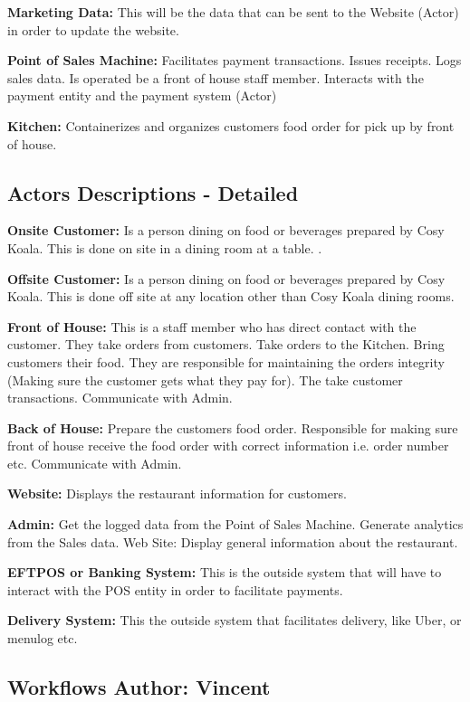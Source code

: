 \documentclass{article}
\begin{document}
\textbf{Marketing Data:} This will be the data that can be sent to the Website (Actor) in order to update the website.

\textbf{Point of Sales Machine:} Facilitates payment transactions. Issues receipts. Logs sales data. Is operated be a front of house staff member. Interacts with the payment entity and the payment system (Actor)

\textbf{Kitchen:} Containerizes and organizes customers food order for pick up by front of house.



\subsection{Actors Descriptions - Detailed}

\textbf{Onsite Customer:} Is a person dining on food or beverages prepared by Cosy Koala. This is done on site in a dining room at a table. .

\textbf{Offsite Customer:} Is a person dining on food or beverages prepared by Cosy Koala. This is done off site at any location other than Cosy Koala dining rooms.

\textbf{Front of House:} This is a staff member who has direct contact with the customer. They take orders from customers. Take orders to the Kitchen. Bring customers their food. They are responsible for maintaining the orders integrity (Making sure the customer gets what they pay for). The take customer transactions. Communicate with Admin.

\textbf{Back of House:} Prepare the customers food order. Responsible for making sure front of house receive the food order with correct information i.e. order number etc. Communicate with Admin.

\textbf{Website:} Displays the restaurant information for customers.

\textbf{Admin:} Get the logged data from the Point of Sales Machine.
Generate analytics from the Sales data.
Web Site: Display general information about the restaurant.

\textbf{EFTPOS or Banking System:} This is the outside system that will have to interact with the POS entity in order to facilitate payments.

\textbf{Delivery System:} This the outside system that facilitates delivery, like Uber, or menulog etc.


\clearpage
\subsection{Workflows \normalsize\textbf{Author: Vincent}}
\end{document}

